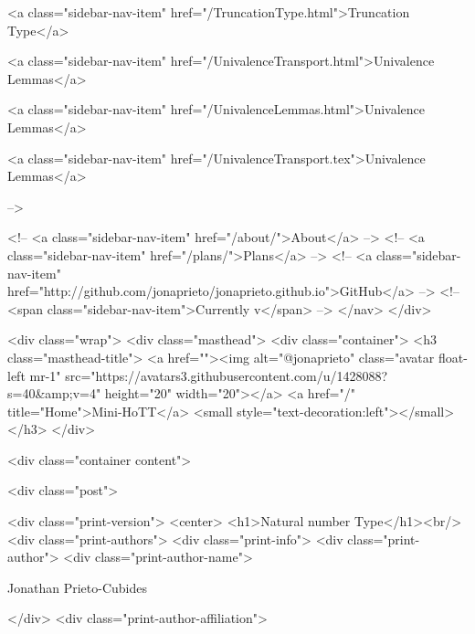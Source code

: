       
    
      
        
          <a class="sidebar-nav-item" href="/TruncationType.html">Truncation Type</a>
        
      
    
      
        
          <a class="sidebar-nav-item" href="/UnivalenceTransport.html">Univalence Lemmas</a>
        
      
    
      
        
          <a class="sidebar-nav-item" href="/UnivalenceLemmas.html">Univalence Lemmas</a>
        
      
    
      
        
          <a class="sidebar-nav-item" href="/UnivalenceTransport.tex">Univalence Lemmas</a>
        
      
     -->

    <!-- <a class="sidebar-nav-item" href="/about/">About</a> -->
    <!-- <a class="sidebar-nav-item" href="/plans/">Plans</a> -->
    <!-- <a class="sidebar-nav-item" href="http://github.com/jonaprieto/jonaprieto.github.io">GitHub</a> -->
    <!-- <span class="sidebar-nav-item">Currently v</span> -->
  </nav>
</div>

    <div class="wrap">
      <div class="masthead">
        <div class="container">
          <h3 class="masthead-title">
            <a href=""><img alt="@jonaprieto" class="avatar float-left mr-1" src="https://avatars3.githubusercontent.com/u/1428088?s=40&amp;v=4" height="20" width="20"></a>
            <a href="/" title="Home">Mini-HoTT</a>
            <small style="text-decoration:left"></small>
          </h3>
        </div>
      
      <div class="container content">
        







<div class="post">

  <div class="print-version">
    <center>
      <h1>Natural number Type</h1><br/>
        <div class="print-authors">
          <div class="print-info">
            <div class="print-author">
              <div class="print-author-name">
                
                  Jonathan Prieto-Cubides
                
              </div>
              <div class="print-author-affiliation">
                
